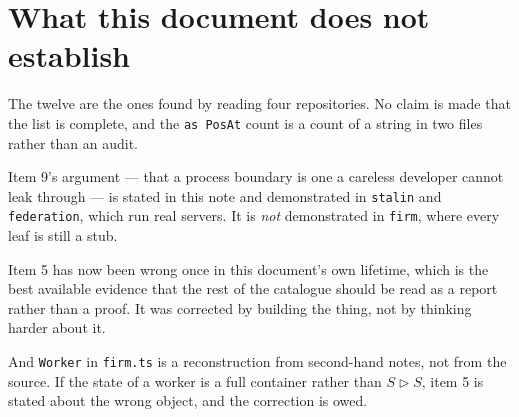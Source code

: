 \documentclass[11pt,a4paper]{article}
\begin{document}
\section{What this document does not establish}

The twelve are the ones found by reading four repositories. No claim is made
that the list is complete, and the \texttt{as PosAt} count is a count of a
string in two files rather than an audit.

Item 9's argument --- that a process boundary is one a careless developer cannot
leak through --- is stated in this note and demonstrated in \texttt{stalin} and
\texttt{federation}, which run real servers. It is \emph{not} demonstrated in
\texttt{firm}, where every leaf is still a stub.

Item 5 has now been wrong once in this document's own lifetime, which is the
best available evidence that the rest of the catalogue should be read as a
report rather than a proof. It was corrected by building the thing, not by
thinking harder about it.

And \texttt{Worker} in \texttt{firm.ts} is a reconstruction from second-hand
notes, not from the source. If the state of a worker is a full container rather
than $S \triangleright S$, item 5 is stated about the wrong object, and the
correction is owed.
\end{document}
